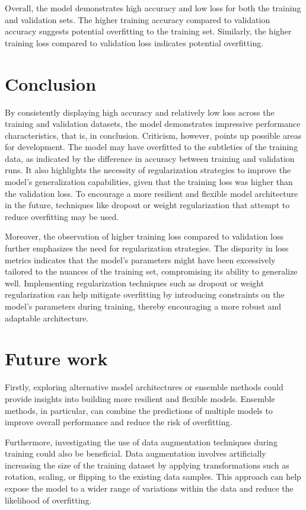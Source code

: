 \documentclass[conference]{IEEEtran}
\begin{document}
Overall, the model demonstrates high accuracy and low loss for both the training and validation sets. The higher training accuracy compared to validation accuracy suggests potential overfitting to the training set. Similarly, the higher training loss compared to validation loss indicates potential overfitting.

\section{Conclusion}

By consistently displaying high accuracy and relatively low loss across the training and validation datasets, the model demonstrates impressive performance characteristics, that is, in conclusion. Criticism, however, points up possible areas for development. The model may have overfitted to the subtleties of the training data, as indicated by the difference in accuracy between training and validation runs. It also highlights the necessity of regularization strategies to improve the model's generalization capabilities, given that the training loss was higher than the validation loss. To encourage a more resilient and flexible model architecture in the future, techniques like dropout or weight regularization that attempt to reduce overfitting may be used. 

Moreover, the observation of higher training loss compared to validation loss further emphasizes the need for regularization strategies. The disparity in loss metrics indicates that the model's parameters might have been excessively tailored to the nuances of the training set, compromising its ability to generalize well. Implementing regularization techniques such as dropout or weight regularization can help mitigate overfitting by introducing constraints on the model's parameters during training, thereby encouraging a more robust and adaptable architecture.

\section{Future work}

Firstly, exploring alternative model architectures or ensemble methods could provide insights into building more resilient and flexible models. Ensemble methods, in particular, can combine the predictions of multiple models to improve overall performance and reduce the risk of overfitting.

Furthermore, investigating the use of data augmentation techniques during training could also be beneficial. Data augmentation involves artificially increasing the size of the training dataset by applying transformations such as rotation, scaling, or flipping to the existing data samples. This approach can help expose the model to a wider range of variations within the data and reduce the likelihood of overfitting.
\end{document}
